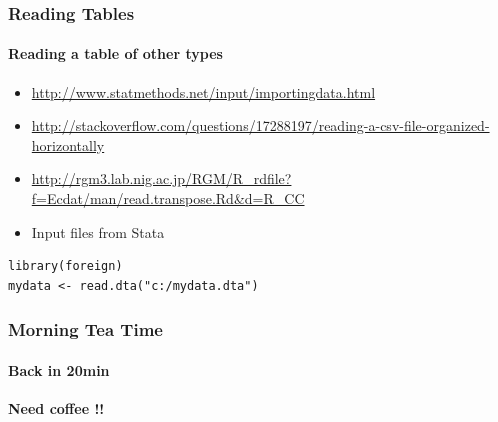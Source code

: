 \documentclass[12pt]{beamer}\usepackage[]{graphicx}\usepackage[]{color}
\begin{document}
\begin{frame}[fragile]
  \frametitle{Reading Tables}
  \framesubtitle{Reading a table of other types}
\begin{itemize}  
\item \url{http://www.statmethods.net/input/importingdata.html}
\item \url{http://stackoverflow.com/questions/17288197/reading-a-csv-file-organized-horizontally}
\item \url{http://rgm3.lab.nig.ac.jp/RGM/R_rdfile?f=Ecdat/man/read.transpose.Rd&d=R_CC}
\item Input files from Stata
\end{itemize}
\begin{lstlisting} 
library(foreign)
mydata <- read.dta("c:/mydata.dta")  
\end{lstlisting} 
\end{frame}

\begin{frame}
  \frametitle{Morning Tea Time}
  \framesubtitle{Back in 20min}
  {\bf Need coffee !!} 
\end{frame}

\end{document}
